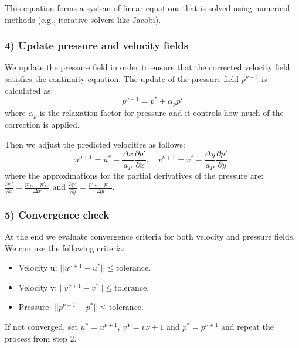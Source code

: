 \documentclass{article}
\begin{document}
This equation forms a system of linear equations that is solved using numerical methods (e.g., iterative solvers like Jacobi).


\subsubsection*{4) Update pressure and velocity fields}
We update the pressure field in order to ensure that the corrected velocity field satisfies the continuity equation. 
The update of the pressure field $p^{\nu +1}$ is calculated as:
\begin{equation}
  p^{\nu+1} = p^* + \alpha_p p'
\end{equation}
where $\alpha_p$ is the relaxation factor for pressure and it controls how much of the correction is applied.

Then we adjust the predicted velocities as follows:
\begin{equation}
  u^{\nu+1} = u^* - \frac{\Delta x}{a_P} \frac{\partial p'}{\partial x}, \quad v^{\nu+1} = v^* - \frac{\Delta y}{a_P} \frac{\partial p'}{\partial y}.
  \end{equation}
where the approximations for the partial derivatives of the pressure are: $\frac{\partial p'}{\partial x} = \frac{p'_{E} - p'_{W}}{\Delta x}$ and $\frac{\partial p'}{\partial y} = \frac{p'_{N} - p'_{S}}{\Delta y}$.

\subsubsection*{5) Convergence check}
At the end we evaluate convergence criteria for both velocity and pressure fields. We can use the following criteria:

\begin{itemize}
  \item Velocity u: $||u^{\nu+1} - u^*|| \leq \text{tolerance}$.
  \item Velocity v: $||v^{\nu+1} - v^*|| \leq \text{tolerance}$.
  \item Pressure: $||p^{\nu+1} - p^*|| \leq \text{tolerance}$.
\end{itemize}

If not converged, set $u^* = u^{\nu+1}$, $v* = v{\nu+1}$ and $p^* = p^{\nu+1}$ and repeat the process from step 2.
\end{document}
